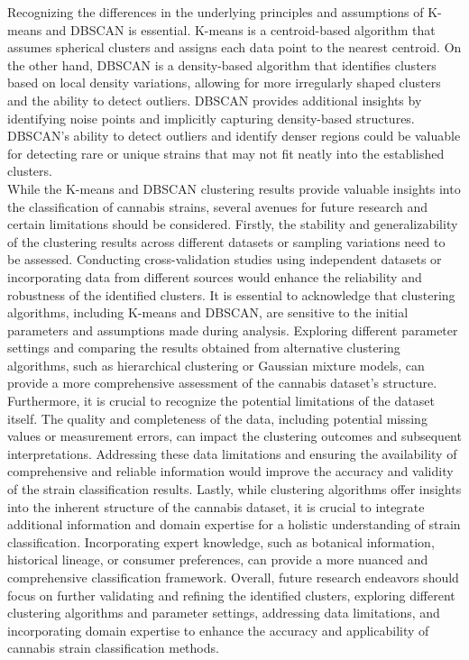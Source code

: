 \documentclass[11pt,a4paper]{article}
\newcommand{\noi}{\noindent}
\begin{document}
\noi
Recognizing the differences in the underlying principles and assumptions of K-means and DBSCAN is essential. K-means is a centroid-based algorithm that assumes spherical clusters and assigns each data point to the nearest centroid. On the other hand, DBSCAN is a density-based algorithm that identifies clusters based on local density variations, allowing for more irregularly shaped clusters and the ability to detect outliers. DBSCAN provides additional insights by identifying noise points and implicitly capturing density-based structures. DBSCAN's ability to detect outliers and identify denser regions could be valuable for detecting rare or unique strains that may not fit neatly into the established clusters.\\

\noi
While the K-means and DBSCAN clustering results provide valuable insights into the classification of cannabis strains, several avenues for future research and certain limitations should be considered. Firstly, the stability and generalizability of the clustering results across different datasets or sampling variations need to be assessed. Conducting cross-validation studies using independent datasets or incorporating data from different sources would enhance the reliability and robustness of the identified clusters. It is essential to acknowledge that clustering algorithms, including K-means and DBSCAN, are sensitive to the initial parameters and assumptions made during analysis. Exploring different parameter settings and comparing the results obtained from alternative clustering algorithms, such as hierarchical clustering or Gaussian mixture models, can provide a more comprehensive assessment of the cannabis dataset's structure.\\

\noi
Furthermore, it is crucial to recognize the potential limitations of the dataset itself. The quality and completeness of the data, including potential missing values or measurement errors, can impact the clustering outcomes and subsequent interpretations. Addressing these data limitations and ensuring the availability of comprehensive and reliable information would improve the accuracy and validity of the strain classification results. Lastly, while clustering algorithms offer insights into the inherent structure of the cannabis dataset, it is crucial to integrate additional information and domain expertise for a holistic understanding of strain classification. Incorporating expert knowledge, such as botanical information, historical lineage, or consumer preferences, can provide a more nuanced and comprehensive classification framework. Overall, future research endeavors should focus on further validating and refining the identified clusters, exploring different clustering algorithms and parameter settings, addressing data limitations, and incorporating domain expertise to enhance the accuracy and applicability of cannabis strain classification methods.\\
\end{document}
